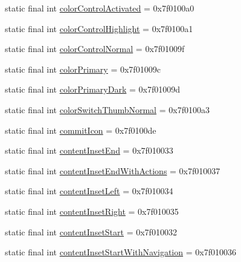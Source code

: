 \begin{CompactItemize}
\item 
static final int \hyperlink{classandroid_1_1support_1_1graphics_1_1drawable_1_1_r_1_1attr_2a9465dcf1800883aac9756586c27198}{colorControlActivated} = 0x7f0100a0
\item 
static final int \hyperlink{classandroid_1_1support_1_1graphics_1_1drawable_1_1_r_1_1attr_0a0038f50062fb57e1c0f748a31a8e56}{colorControlHighlight} = 0x7f0100a1
\item 
static final int \hyperlink{classandroid_1_1support_1_1graphics_1_1drawable_1_1_r_1_1attr_b6d4ab73db1831ee2eedf2e03e895ee1}{colorControlNormal} = 0x7f01009f
\item 
static final int \hyperlink{classandroid_1_1support_1_1graphics_1_1drawable_1_1_r_1_1attr_b9425e828c8da7545fc691bbdcad548a}{colorPrimary} = 0x7f01009c
\item 
static final int \hyperlink{classandroid_1_1support_1_1graphics_1_1drawable_1_1_r_1_1attr_23da7468b32ff7a3a5177fdf1a903547}{colorPrimaryDark} = 0x7f01009d
\item 
static final int \hyperlink{classandroid_1_1support_1_1graphics_1_1drawable_1_1_r_1_1attr_efbb6ee9181341dd7236f5f6d89e1efc}{colorSwitchThumbNormal} = 0x7f0100a3
\item 
static final int \hyperlink{classandroid_1_1support_1_1graphics_1_1drawable_1_1_r_1_1attr_3f7941deb851288eeb9f35cd76feca3a}{commitIcon} = 0x7f0100de
\item 
static final int \hyperlink{classandroid_1_1support_1_1graphics_1_1drawable_1_1_r_1_1attr_b7284e45241ce881c7ae97c4d7c5f2c3}{contentInsetEnd} = 0x7f010033
\item 
static final int \hyperlink{classandroid_1_1support_1_1graphics_1_1drawable_1_1_r_1_1attr_a68f41a8a33c3cee1d59c3262c781c09}{contentInsetEndWithActions} = 0x7f010037
\item 
static final int \hyperlink{classandroid_1_1support_1_1graphics_1_1drawable_1_1_r_1_1attr_b4173a048c6688f48e47ec7f1fbad489}{contentInsetLeft} = 0x7f010034
\item 
static final int \hyperlink{classandroid_1_1support_1_1graphics_1_1drawable_1_1_r_1_1attr_e20ffa2a480f0dcb0c9799ab9595cfa1}{contentInsetRight} = 0x7f010035
\item 
static final int \hyperlink{classandroid_1_1support_1_1graphics_1_1drawable_1_1_r_1_1attr_f1266f3eec1e1a2c74543bb9c3bcfa59}{contentInsetStart} = 0x7f010032
\item 
static final int \hyperlink{classandroid_1_1support_1_1graphics_1_1drawable_1_1_r_1_1attr_c16ae7d4468d0838176d7559c62c8bb5}{contentInsetStartWithNavigation} = 0x7f010036

\end{CompactItemize}
